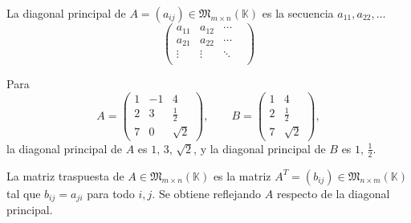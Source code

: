 \documentclass[a4paper,12pt]{article}
\begin{document}
\begin{procedimiento}[title=Diagonal principal]
La diagonal principal de $A = (a_{ij}) \in \mathfrak{M}_{m \times n}(\mathbb{K})$ es la secuencia $a_{11}, a_{22}, \dots$
\[
\begin{pmatrix}
\boxed{a_{11}} & a_{12} & \cdots \\
a_{21} & \boxed{a_{22}} & \cdots \\
\vdots & \vdots & \ddots &\\
\end{pmatrix}
\]
\end{procedimiento}

\begin{ejemplo}[title=Ejemplos de diagonales principales]
Para
\[
A=
\begin{pmatrix}
\boxed{1} & -1 & 4 \\
2 & \boxed{3} & \tfrac{1}{2} \\
7 & 0 & \boxed{\sqrt{2}}
\end{pmatrix},
\qquad
B=
\begin{pmatrix}
\boxed{1} & 4 \\
2 & \boxed{\tfrac{1}{2}} \\
7 & \sqrt{2}
\end{pmatrix},
\]
la diagonal principal de $A$ es ${1},\, {3},\, {\sqrt{2}}$,  
y la diagonal principal de $B$ es ${1},\, {\tfrac{1}{2}}$.
\end{ejemplo}

\begin{procedimiento}[title=Matriz traspuesta]
La matriz traspuesta de $A \in \mathfrak{M}_{m \times n}(\mathbb{K})$ es la matriz 
$A^T = (b_{ij}) \in \mathfrak{M}_{n \times m}(\mathbb{K})$ tal que 
$b_{ij} = a_{ji}$ para todo $i,j$.  
Se obtiene reflejando $A$ respecto de la diagonal principal.
\end{procedimiento}
\end{document}
